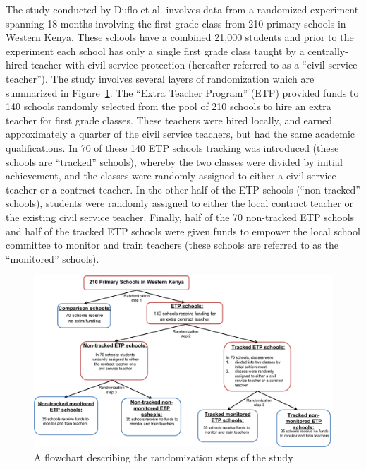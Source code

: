 \documentclass[11pt]{article}
\begin{document}
 The study conducted by Duflo et al. involves data from a randomized experiment spanning 18 months involving the first grade class from 210 primary schools in Western Kenya. These schools have a combined 21,000 students and prior to the experiment each school has only a single first grade class taught by a centrally-hired teacher with civil service protection (hereafter referred to as a ``civil service teacher''). The study involves several layers of randomization which are summarized in Figure~\ref{fig:randomization}. The ``Extra Teacher Program'' (ETP) provided funds to 140 schools randomly selected from the pool of 210 schools to hire an extra teacher for first grade classes. These teachers were hired locally, and earned approximately a quarter of the civil service teachers, but had the same academic qualifications. In 70 of these 140 ETP schools tracking was introduced (these schools are ``tracked'' schools), whereby the two classes were divided by initial achievement, and the classes were randomly assigned to either a civil service teacher or a contract teacher. In the other half of the ETP schools (``non tracked'' schools), students were randomly assigned to either the local contract teacher or the existing civil service teacher. Finally, half of the 70 non-tracked ETP schools and half of the tracked ETP schools were given funds to empower the local school committee to monitor and train teachers (these schools are referred to as the ``monitored'' schools).
 
 \begin{figure}[H]
 \centering
 \includegraphics[scale=0.5]{Randomization_flow.png}
 \caption{A flowchart describing the randomization steps of the study}
 \label{fig:randomization}
 \end{figure}
 
\end{document}
